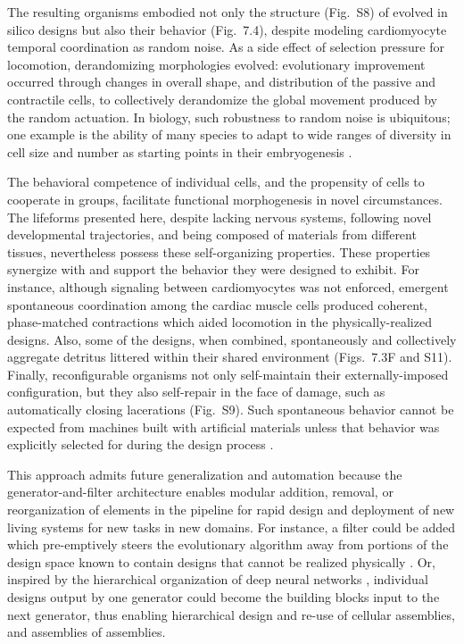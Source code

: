 The resulting organisms embodied not only the structure (Fig.~S8) of evolved in silico designs but also their behavior (Fig.~7.4), despite modeling cardiomyocyte temporal coordination as random noise. 
As a side effect of selection pressure for locomotion, derandomizing morphologies evolved: evolutionary improvement occurred through changes in overall shape, and distribution of the passive and contractile cells, to collectively derandomize the global movement produced by the random actuation. 
In biology, such robustness to random noise is ubiquitous; one example is the ability of many species to adapt to wide ranges of diversity in cell size and number as starting points in their embryogenesis \cite{cooke1981scale}.

The behavioral competence of individual cells, and the propensity of cells to cooperate in groups, facilitate functional morphogenesis in novel circumstances. 
The lifeforms presented here, despite lacking nervous systems, following novel developmental trajectories, and being composed of materials from different tissues, nevertheless possess these self-organizing properties. 
These properties synergize with and support the behavior they were designed to exhibit. 
For instance, although signaling between cardiomyocytes was not enforced, emergent spontaneous coordination among the cardiac muscle cells produced coherent, phase-matched contractions which aided locomotion in the physically-realized designs. 
Also, some of the designs, when combined, spontaneously and collectively aggregate detritus littered within their shared environment (Figs.~7.3F and S11). 
Finally, reconfigurable organisms not only self-maintain their externally-imposed configuration, but they also self-repair in the face of damage, such as automatically closing lacerations (Fig.~S9). 
Such spontaneous behavior cannot be expected from machines built with artificial materials unless that behavior was explicitly selected for during the design process \cite{kriegman2019automated}.

This approach admits future generalization and automation because the generator-and-filter architecture enables modular addition, removal, or reorganization of elements in the pipeline for rapid design and deployment of new living systems for new tasks in new domains. 
For instance, a filter could be added which pre-emptively steers the evolutionary algorithm away from portions of the design space known to contain designs that cannot be realized physically \cite{koos2013transferability}. 
Or, inspired by the hierarchical organization of deep neural networks \cite{zeiler2014visualizing}, individual designs output by one generator could become the building blocks input to the next generator, thus enabling hierarchical design and re-use of cellular assemblies, and assemblies of assemblies.

